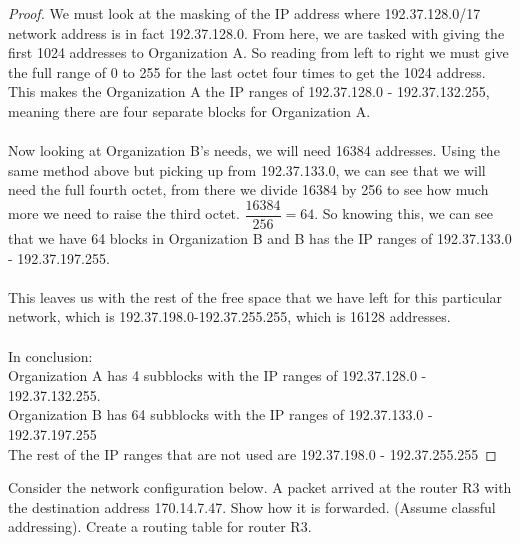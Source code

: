 \documentclass[12pt]{article}
\newenvironment{exercise}[2][Exercise]{\begin{trivlist}
\item[\hskip \labelsep {\bfseries #1}\hskip \labelsep {\bfseries #2.}]}{\end{trivlist}}
\begin{document}
\begin{proof}
We must look at the masking of the IP address where 192.37.128.0/17 network address is in fact 192.37.128.0. From here, we are tasked with giving the first 1024 addresses to Organization A. So reading from left to right we must give the full range of 0 to 255 for the last octet four times to get the 1024 address. This makes the Organization A the IP ranges of 192.37.128.0 - 192.37.132.255, meaning there are four separate blocks for Organization A. \\ \\ 
Now looking at Organization B's needs, we will need 16384 addresses. Using the same method above but picking up from 192.37.133.0, we can see that we will need the full fourth octet, from there we divide 16384 by 256 to see how much more we need to raise the third octet. $\dfrac{16384}{256} = 64$. So knowing this, we can see that we have 64 blocks in Organization B and B has the IP ranges of 192.37.133.0 - 192.37.197.255. \\ \\ This leaves us with the rest of the free space that we have left for this particular network, which is 192.37.198.0-192.37.255.255, which is 16128 addresses. \\ \\ 
In conclusion: \\
Organization A has 4 subblocks with the IP ranges of 192.37.128.0 - 192.37.132.255. \\ 
Organization B has 64 subblocks with the IP ranges of 192.37.133.0 - 192.37.197.255 \\ 
The rest of the IP ranges that are not used are 192.37.198.0 - 192.37.255.255
\end{proof}

\begin{exercise}{13} 
Consider the network configuration below. A packet arrived at the router R3 with the destination address 170.14.7.47. Show how it is forwarded. (Assume classful addressing). Create a routing table for router R3.
\end{exercise}
\end{document}
